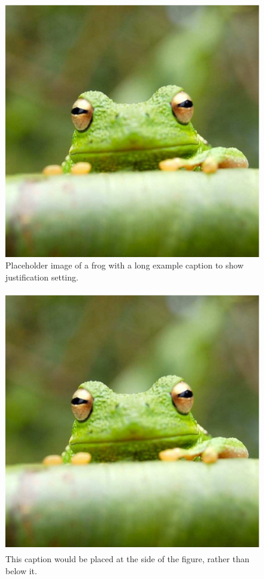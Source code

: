 \documentclass[9pt,twocolumn,twoside]{pnas-new}
\begin{document}
\begin{figure}%
\centering
\includegraphics[width=.8\linewidth]{figures/frog}
\caption{Placeholder image of a frog with a long example caption to show justification setting.}
\label{fig:frog}
\end{figure}


\begin{figure}
\centering
\includegraphics[width=11.4cm,height=11.4cm]{figures/frog}
\caption{This caption would be placed at the side of the figure, rather than below it.}\label{fig:side}
\end{figure}
\end{document}
